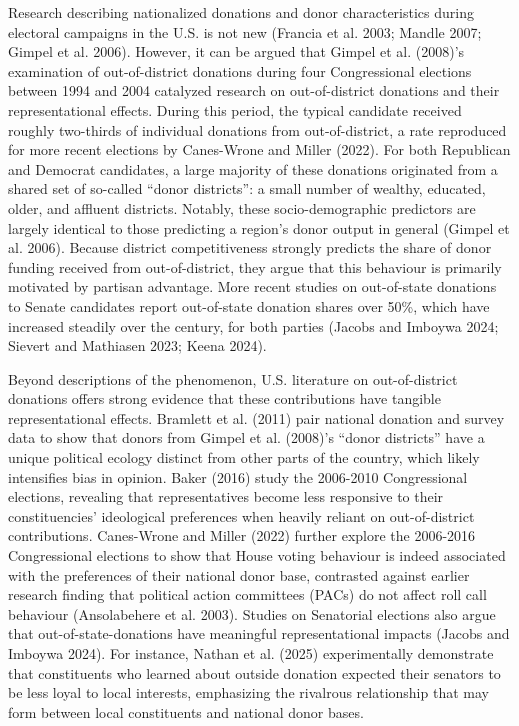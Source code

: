 \documentclass[
  letterpaper,
  DIV=11,
  numbers=noendperiod]{scrartcl}
\begin{document}
Research describing nationalized donations and donor characteristics
during electoral campaigns in the U.S. is not new (Francia et al. 2003;
Mandle 2007; Gimpel et al. 2006). However, it can be argued that Gimpel
et al. (2008)'s examination of out-of-district donations during four
Congressional elections between 1994 and 2004 catalyzed research on
out-of-district donations and their representational effects. During
this period, the typical candidate received roughly two-thirds of
individual donations from out-of-district, a rate reproduced for more
recent elections by Canes-Wrone and Miller (2022). For both Republican
and Democrat candidates, a large majority of these donations originated
from a shared set of so-called ``donor districts'': a small number of
wealthy, educated, older, and affluent districts. Notably, these
socio-demographic predictors are largely identical to those predicting a
region's donor output in general (Gimpel et al. 2006). Because district
competitiveness strongly predicts the share of donor funding received
from out-of-district, they argue that this behaviour is primarily
motivated by partisan advantage. More recent studies on out-of-state
donations to Senate candidates report out-of-state donation shares over
50\%, which have increased steadily over the century, for both parties
(Jacobs and Imboywa 2024; Sievert and Mathiasen 2023; Keena 2024).

Beyond descriptions of the phenomenon, U.S. literature on
out-of-district donations offers strong evidence that these
contributions have tangible representational effects. Bramlett et al.
(2011) pair national donation and survey data to show that donors from
Gimpel et al. (2008)'s ``donor districts'' have a unique political
ecology distinct from other parts of the country, which likely
intensifies bias in opinion. Baker (2016) study the 2006-2010
Congressional elections, revealing that representatives become less
responsive to their constituencies' ideological preferences when heavily
reliant on out-of-district contributions. Canes-Wrone and Miller (2022)
further explore the 2006-2016 Congressional elections to show that House
voting behaviour is indeed associated with the preferences of their
national donor base, contrasted against earlier research finding that
political action committees (PACs) do not affect roll call behaviour
(Ansolabehere et al. 2003). Studies on Senatorial elections also argue
that out-of-state-donations have meaningful representational impacts
(Jacobs and Imboywa 2024). For instance, Nathan et al. (2025)
experimentally demonstrate that constituents who learned about outside
donation expected their senators to be less loyal to local interests,
emphasizing the rivalrous relationship that may form between local
constituents and national donor bases.
\end{document}
